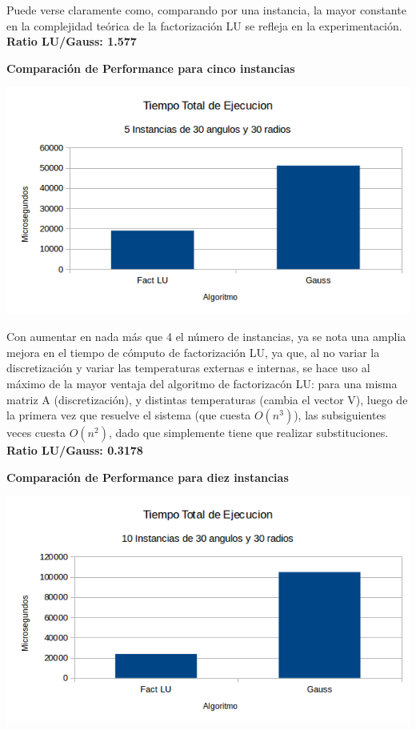 Puede verse claramente como, comparando por una instancia, la mayor constante en la complejidad te\'orica de la factorizaci\'on LU se refleja en la experimentaci\'on. \textbf{Ratio LU/Gauss: 1.577}

 \textbf{Comparaci\'on de Performance para cinco instancias}\\
\begin{center}
\includegraphics[scale=0.7]{experimentos2a_2b/2bCincoInstancias.png}
\end{center}

Con aumentar en nada m\'as que 4 el n\'umero de instancias, ya se nota una amplia mejora en el tiempo de c\'omputo de factorizaci\'on LU, ya que, al no variar la discretizaci\'on y variar las temperaturas externas e internas, se hace uso al m\'aximo de la mayor ventaja del algoritmo de factorizac\'on LU: para una misma matriz A (discretizaci\'on), y distintas temperaturas (cambia el vector V), luego de la primera vez que resuelve el sistema (que cuesta $O(n^3)$), las subsiguientes veces cuesta $O(n^2)$, dado que simplemente tiene que realizar substituciones. \textbf{Ratio LU/Gauss: 0.3178}

 \textbf{Comparaci\'on de Performance para diez instancias}\\
\begin{center}
\includegraphics[scale=0.7]{experimentos2a_2b/2bDiezInstancias.png}
\end{center}

